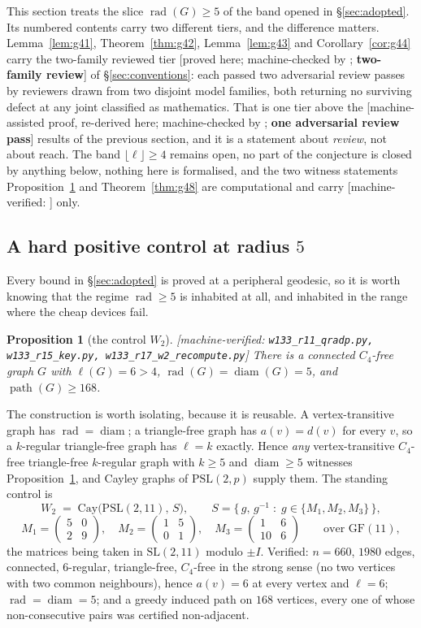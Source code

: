 \documentclass[11pt]{article}
\theoremstyle{plain}
\newtheorem{proposition}[theorem]{Proposition}
\theoremstyle{definition}
\theoremstyle{remark}
\numberwithin{equation}{section}
\newcommand{\rad}{\operatorname{rad}}
\newcommand{\diam}{\operatorname{diam}}
\newcommand{\pth}{\operatorname{path}}
\newcommand{\statusbox}[1]{{\small\sloppy\textsf{[#1]}}}
\newcommand{\REV}[1]{\statusbox{proved here; machine-checked by \texttt{#1};
\textbf{two-family review}}}
\newcommand{\AD}[1]{\statusbox{machine-assisted proof, re-derived here;
machine-checked by \texttt{#1}; \textbf{one adversarial review pass}}}
\newcommand{\MV}[1]{\statusbox{machine-verified: \texttt{#1}}}
\begin{document}
This section treats the slice $\rad(G)\ge 5$ of the band opened in \S\ref{sec:adopted}. Its
numbered contents carry two different tiers, and the difference matters.
Lemma~\ref{lem:g41}, Theorem~\ref{thm:g42}, Lemma~\ref{lem:g43} and
Corollary~\ref{cor:g44} carry the two-family reviewed tier \REV{} of \S\ref{sec:conventions}:
each passed two adversarial review passes by reviewers drawn from two disjoint model
families, both returning no surviving defect at any joint classified as mathematics. That is
one tier above the \AD{} results of the previous section, and it is a statement about
\emph{review}, not about reach. The band $\lfloor\ell\rfloor \ge 4$ remains open, no part of
the conjecture is closed by anything below, nothing here is formalised, and the two witness
statements Proposition~\ref{prop:w2} and Theorem~\ref{thm:g48} are computational and carry
\MV{} only.

\subsection{A hard positive control at radius $5$}

Every bound in \S\ref{sec:adopted} is proved at a peripheral geodesic, so it is worth knowing
that the regime $\rad \ge 5$ is inhabited at all, and inhabited in the range where the cheap
devices fail.

\begin{proposition}[the control $W_2$]\label{prop:w2}
\MV{w133\_r11\_qradp.py, w133\_r15\_key.py, w133\_r17\_w2\_recompute.py}
There is a connected $C_4$-free graph $G$ with $\ell(G) = 6 > 4$, $\rad(G) = \diam(G) = 5$,
and $\pth(G)\ge 168$.
\end{proposition}

The construction is worth isolating, because it is reusable. A vertex-transitive graph has
$\rad = \diam$; a triangle-free graph has $a(v) = d(v)$ for every $v$, so a $k$-regular
triangle-free graph has $\ell = k$ exactly. Hence \emph{any} vertex-transitive $C_4$-free
triangle-free $k$-regular graph with $k \ge 5$ and $\diam \ge 5$ witnesses
Proposition~\ref{prop:w2}, and Cayley graphs of $\mathrm{PSL}(2,p)$ supply them. The standing
control is
\[
  W_2 \;=\; \mathrm{Cay}\bigl(\mathrm{PSL}(2,11),\, S\bigr), \qquad
  S = \{\,g,\,g^{-1} \;:\; g \in \{M_1,M_2,M_3\}\,\},
\]
\[
  M_1 = \begin{pmatrix} 5 & 0\\ 2 & 9\end{pmatrix},\quad
  M_2 = \begin{pmatrix} 1 & 5\\ 0 & 1\end{pmatrix},\quad
  M_3 = \begin{pmatrix} 1 & 6\\ 10 & 6\end{pmatrix}
  \qquad \text{over } \mathrm{GF}(11),
\]
the matrices being taken in $\mathrm{SL}(2,11)$ modulo $\pm I$. Verified: $n = 660$,
$1980$ edges, connected, $6$-regular, triangle-free, $C_4$-free in the strong sense (no two
vertices with two common neighbours), hence $a(v) = 6$ at every vertex and $\ell = 6$;
$\rad = \diam = 5$; and a greedy induced path on $168$ vertices, every one of whose
non-consecutive pairs was certified non-adjacent.
\end{document}
